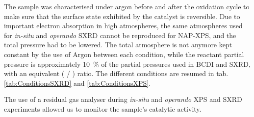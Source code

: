 The sample was characterised under argon before and after the oxidation cycle to make sure that the surface state exhibited by the catalyst is reversible.
Due to important electron absorption in high atmospheres, the same atmospheres used for \textit{in-situ} and \textit{operando} SXRD cannot be reproduced for NAP-XPS, and the total pressure had to be lowered.
The total atmosphere is not anymore kept constant by the use of Argon between each condition, while the reactant partial pressure is approximately \qty{10}{\percent} of the partial pressures used in BCDI and SXRD, with an equivalent ( / ) ratio.
The different conditions are resumed in tab. \ref{tab:ConditionsSXRD} and \ref{tab:ConditionsXPS}.

The use of a residual gas analyser during \textit{in-situ} and \textit{operando} XPS and SXRD experiments allowed us to monitor the sample's catalytic activity.

\begin{table}[!htb]
\centering
{}
\caption{Different atmospheres used to probe the ammonia oxidation on Pt(100) and Pt(111) single crystals with SXRD.}
\label{tab:ConditionsSXRD}
\end{table}

